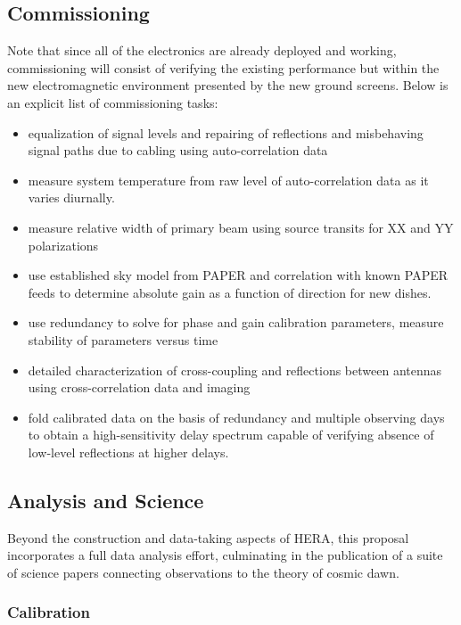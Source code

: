 \documentclass[preprint]{aastex}
\begin{document}
\vspace{-0.25in}
\subsection{Commissioning}
\vspace{-6pt}
Note that since all of the electronics are already deployed and working, commissioning will consist of verifying the existing performance but within the new electromagnetic environment presented by the new ground screens.  Below is
an explicit list of commissioning tasks:
\begin{itemize}[noitemsep,nolistsep]
\item equalization of signal levels and repairing of reflections and misbehaving signal paths due to cabling using auto-correlation data 
\item measure system temperature from raw level of auto-correlation data as it varies diurnally.
\item measure relative width of primary beam using source transits for XX and YY polarizations 
\item use established sky model from PAPER and correlation with known PAPER feeds to 
determine absolute gain as a function of direction for new dishes. 
\item use redundancy to solve for phase and gain calibration parameters, measure stability of parameters versus 
time 
\item detailed characterization of cross-coupling and reflections between antennas using cross-correlation data and imaging 
\item fold calibrated data on the basis of redundancy and multiple observing days to obtain a high-sensitivity delay spectrum capable of verifying absence of low-level reflections at higher delays. 
\end{itemize}

\subsection{Analysis and Science}

Beyond the construction and data-taking aspects of HERA, this proposal incorporates a full data analysis effort, culminating in the publication of a suite of science papers connecting observations to the theory of cosmic dawn.

\subsubsection{Calibration}
\end{document}
